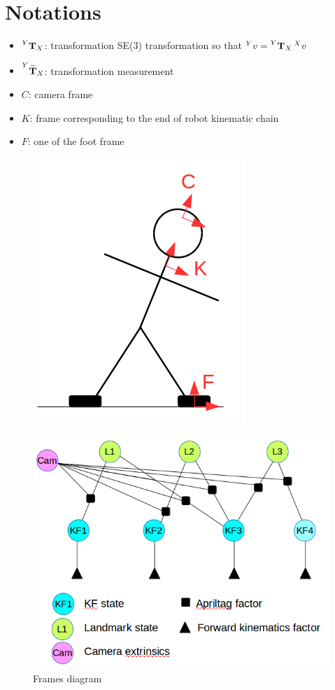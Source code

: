 \documentclass[11pt]{article}
\newcommand{\T}[2]{\prescript{#1}{}{\bfT}_{#2}}
\newcommand{\Tm}[2]{\prescript{#1}{}{\widetilde{\bfT}}_{#2}}
\begin{document}
\section{Notations}
\begin{itemize}
    \item $\T{Y}{X}$: transformation SE(3) transformation so that $\prescript{Y}{}{v}=\T{Y}{X}\prescript{X}{}{v}$
    \item $\Tm{Y}{X}$: transformation measurement
    \item $C$: camera frame
    \item $K$: frame corresponding to the end of robot kinematic chain 
    \item $F$: one of the foot frame 
\end{itemize}

\begin{figure}[ht]
\begin{minipage}[c]{.46\linewidth}
    \centering
    \includegraphics[width=0.6\linewidth]{img/robot_sketch.png}
    \label{fig:sketch}
    \caption{Frames diagram}
\end{minipage} \hfill
\begin{minipage}[c]{.46\linewidth}
    \centering
    \includegraphics[width=\linewidth]{img/cam_extrinsics_factor_graph.png}

\end{minipage}
\end{figure}
\end{document}
